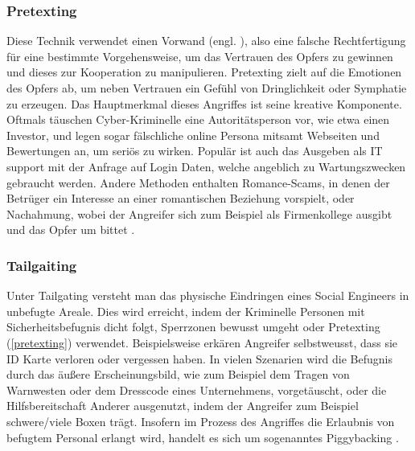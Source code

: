 \subsubsection{Pretexting}
\label{pretexting}
Diese Technik verwendet einen Vorwand (engl. ), also eine falsche Rechtfertigung für eine bestimmte Vorgehensweise, um das Vertrauen des
Opfers zu gewinnen und dieses zur Kooperation zu manipulieren. Pretexting zielt auf die Emotionen des Opfers ab, um neben Vertrauen ein Gefühl von
Dringlichkeit oder Symphatie zu erzeugen. Das Hauptmerkmal dieses Angriffes ist seine kreative Komponente. Oftmals täuschen Cyber-Kriminelle
eine Autoritätsperson vor, wie etwa einen Investor, und legen sogar fälschliche online Persona mitsamt Webseiten und Bewertungen an, um seriös zu wirken.
Populär ist auch das Ausgeben als IT support mit der Anfrage auf Login Daten, welche angeblich zu Wartungszwecken gebraucht werden.
Andere Methoden enthalten Romance-Scams, in denen der Betrüger ein Interesse an einer romantischen Beziehung vorspielt, oder Nachahmung, wobei der
Angreifer sich zum Beispiel als Firmenkollege ausgibt und das Opfer um  bittet .

\subsubsection{Tailgaiting}
Unter Tailgating versteht man das physische Eindringen eines Social Engineers in unbefugte Areale.
Dies wird erreicht, indem der Kriminelle Personen mit Sicherheitsbefugnis dicht folgt, Sperrzonen bewusst umgeht oder Pretexting (\autoref{pretexting})
verwendet. Beispielsweise erkären Angreifer selbstweusst, dass sie ID Karte verloren oder vergessen haben. In vielen Szenarien wird die
Befugnis durch das äußere Erscheinungsbild, wie zum Beispiel dem Tragen von Warnwesten oder dem Dresscode eines Unternehmens, vorgetäuscht, oder die Hilfsbereitschaft Anderer ausgenutzt,
indem der Angreifer zum Beispiel schwere/viele Boxen trägt. Insofern im Prozess des Angriffes die Erlaubnis von befugtem Personal erlangt wird, handelt es sich um sogenanntes Piggybacking .

